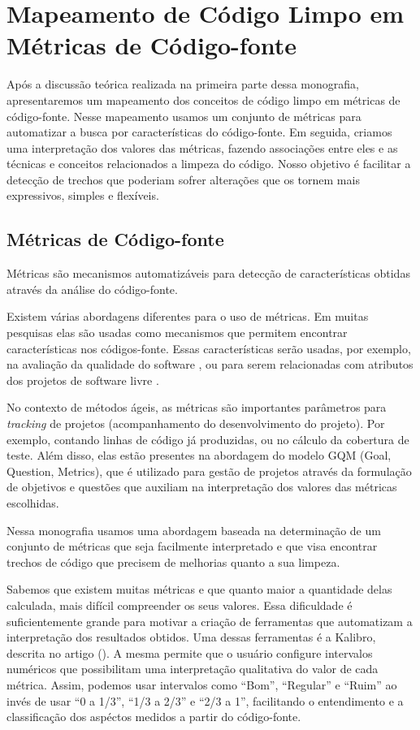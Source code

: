 \chapter{Mapeamento de Código Limpo em Métricas de Código-fonte}
\label{chap:mapeamento}	

	Após a discussão teórica realizada na primeira parte dessa 	monografia, apresentaremos um mapeamento dos conceitos de código limpo em métricas de código-fonte. Nesse mapeamento usamos um conjunto de métricas para automatizar a busca por características do código-fonte. Em seguida, criamos uma interpretação dos valores das métricas, fazendo associações entre eles e as técnicas e conceitos relacionados a limpeza do código. Nosso objetivo é facilitar a detecção de trechos que poderiam sofrer alterações que os tornem mais expressivos, simples e flexíveis.


\section{Métricas de Código-fonte}

	Métricas são mecanismos automatizáveis para detecção de características obtidas através da análise do código-fonte.
	
	Existem várias abordagens diferentes para o uso de métricas. Em muitas pesquisas elas são usadas como mecanismos que permitem encontrar características nos códigos-fonte. Essas características serão usadas, por exemplo, na avaliação da qualidade do software \citep{meirelles:sbqs09}, ou para serem relacionadas com atributos dos projetos de software livre \citep{meirelles2010}. 
	
	No contexto de métodos ágeis, as métricas são importantes parâmetros para \textit{tracking} de projetos (acompanhamento do desenvolvimento do projeto). Por exemplo, contando linhas de código já produzidas, ou no cálculo da cobertura de teste.	Além disso, elas estão presentes na abordagem do modelo GQM (Goal, Question, Metrics), que é utilizado para gestão de projetos através da formulação de objetivos e questões que auxiliam na interpretação dos valores das métricas escolhidas.
	
	Nessa monografia usamos uma abordagem baseada na determinação de um conjunto de métricas que seja facilmente interpretado e que visa encontrar trechos de código que precisem de melhorias quanto a sua limpeza.
	
	Sabemos que existem muitas métricas e que quanto maior a quantidade delas calculada, mais difícil compreender os seus valores. Essa dificuldade é suficientemente grande para motivar a criação de ferramentas que automatizam a interpretação dos resultados obtidos. Uma dessas ferramentas é a Kalibro, descrita no artigo (\citep{meirelles:sbes09}). A mesma permite que o usuário configure intervalos numéricos que possibilitam uma interpretação qualitativa do valor de cada métrica. Assim, podemos usar intervalos como ``Bom'', ``Regular'' e ``Ruim'' ao invés de usar ``0 a 1/3'', ``1/3 a 2/3'' e ``2/3 a 1'', facilitando o entendimento e a classificação dos aspéctos medidos a partir do código-fonte.
	

